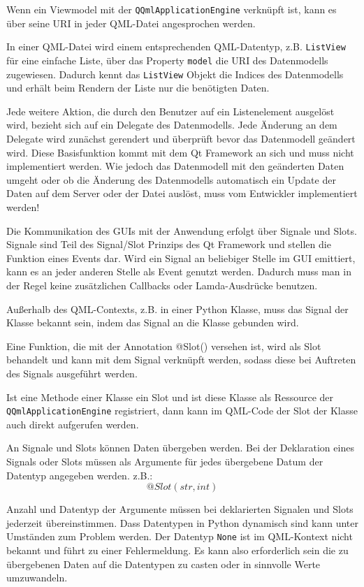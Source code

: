 Wenn ein Viewmodel mit der \verb|QQmlApplicationEngine| verknüpft ist, kann es über seine URI in jeder QML-Datei angesprochen werden.

In einer QML-Datei wird einem entsprechenden QML-Datentyp, z.B. \verb|ListView| für eine einfache Liste,
über das Property \verb|model| die URI des Datenmodells zugewiesen.
Dadurch kennt das \verb|ListView| Objekt die Indices des Datenmodells und erhält beim Rendern der Liste nur die benötigten
Daten.

Jede weitere Aktion, die durch den Benutzer auf ein Listenelement ausgelöst wird, bezieht sich auf ein Delegate des Datenmodells.
Jede Änderung an dem Delegate wird zunächst gerendert und überprüft bevor das Datenmodell geändert wird.
Diese Basisfunktion kommt mit dem Qt Framework an sich und muss nicht implementiert werden.
Wie jedoch das Datenmodell mit den geänderten Daten umgeht oder ob die Änderung des Datenmodells automatisch ein Update
der Daten auf dem Server oder der Datei auslöst, muss vom Entwickler implementiert werden!

Die Kommunikation des GUIs mit der Anwendung erfolgt über Signale und Slots.
Signale sind Teil des Signal/Slot Prinzips des Qt Framework \cite{pysideSignalSlot} und stellen die Funktion eines Events dar.
Wird ein Signal an beliebiger Stelle im GUI emittiert, kann es an jeder anderen Stelle als Event genutzt werden.
Dadurch muss man in der Regel keine zusätzlichen Callbacks oder Lamda-Ausdrücke benutzen.

Außerhalb des QML-Contexts, z.B. in einer Python Klasse, muss das Signal der Klasse bekannt sein, indem das Signal an die Klasse
gebunden wird.

Eine Funktion, die mit der Annotation \glqq @Slot()\grqq{} versehen ist, wird als Slot behandelt und kann mit dem Signal
verknüpft werden, sodass diese bei Auftreten des Signals ausgeführt werden.

Ist eine Methode einer Klasse ein Slot und ist diese Klasse als Ressource der \\\verb|QQmlApplicationEngine| registriert,
dann kann im QML-Code der Slot der Klasse auch direkt aufgerufen werden. 

An Signale und Slots können Daten übergeben werden.
Bei der Deklaration eines Signals oder Slots müssen als Argumente für jedes übergebene Datum der Datentyp angegeben werden. 
z.B.: $$@Slot(str, int)$$

Anzahl und Datentyp der Argumente müssen bei deklarierten Signalen und Slots jederzeit übereinstimmen. 
Dass Datentypen in Python dynamisch sind kann unter Umständen zum Problem werden. 
Der Datentyp \verb|None| ist im QML-Kontext nicht bekannt und führt zu einer Fehlermeldung. 
Es kann also erforderlich sein die zu übergebenen Daten auf die Datentypen zu casten oder in sinnvolle Werte umzuwandeln.

